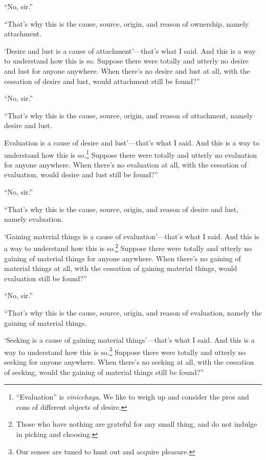 \documentclass[12pt,openany]{book}%
\begin{document}
“No, sir.” 

“That’s why this is the cause, source, origin, and reason of ownership, namely attachment. 

‘Desire and lust is a cause of attachment’—that’s what I said. And this is a way to understand how this is so. Suppose there were totally and utterly no desire and lust for anyone anywhere. When there’s no desire and lust at all, with the cessation of desire and lust, would attachment still be found?” 

“No, sir.” 

“That’s why this is the cause, source, origin, and reason of attachment, namely desire and lust. 

Evaluation is a cause of desire and lust’—that’s what I said. And this is a way to understand how this is so.\footnote{“Evaluation” is \textit{vinicchaya}. We like to weigh up and consider the pros and cons of different objects of desire. } Suppose there were totally and utterly no evaluation for anyone anywhere. When there’s no evaluation at all, with the cessation of evaluation, would desire and lust still be found?” 

“No, sir.” 

“That’s why this is the cause, source, origin, and reason of desire and lust, namely evaluation. 

‘Gaining material things is a cause of evaluation’—that’s what I said. And this is a way to understand how this is so.\footnote{Those who have nothing are grateful for any small thing, and do not indulge in picking and choosing. } Suppose there were totally and utterly no gaining of material things for anyone anywhere. When there’s no gaining of material things at all, with the cessation of gaining material things, would evaluation still be found?” 

“No, sir.” 

“That’s why this is the cause, source, origin, and reason of evaluation, namely the gaining of material things. 

‘Seeking is a cause of gaining material things’—that’s what I said. And this is a way to understand how this is so.\footnote{Our senses are tuned to hunt out and acquire pleasure. } Suppose there were totally and utterly no seeking for anyone anywhere. When there’s no seeking at all, with the cessation of seeking, would the gaining of material things still be found?” 
\end{document}
